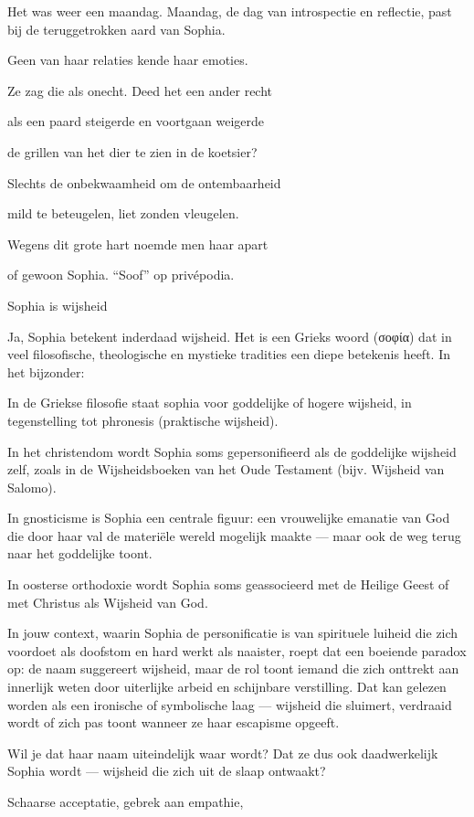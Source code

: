 Het was weer een maandag.
Maandag, de dag van introspectie en reflectie, past bij de teruggetrokken aard van Sophia.

Geen van haar relaties
kende haar emoties.

Ze zag die als onecht.
Deed het een ander recht

als een paard steigerde
en voortgaan weigerde

de grillen van het dier
te zien in de koetsier?

Slechts de onbekwaamheid
om de ontembaarheid

mild te beteugelen,
liet zonden vleugelen.

Wegens dit grote hart
noemde men haar apart

of gewoon Sophia.
“Soof” op privépodia.

Sophia is wijsheid

Ja, Sophia betekent inderdaad wijsheid. Het is een Grieks woord (σοφία) dat in veel filosofische, theologische en mystieke tradities een diepe betekenis heeft. In het bijzonder:

In de Griekse filosofie staat sophia voor goddelijke of hogere wijsheid, in tegenstelling tot phronesis (praktische wijsheid).

In het christendom wordt Sophia soms gepersonifieerd als de goddelijke wijsheid zelf, zoals in de Wijsheidsboeken van het Oude Testament (bijv. Wijsheid van Salomo).

In gnosticisme is Sophia een centrale figuur: een vrouwelijke emanatie van God die door haar val de materiële wereld mogelijk maakte — maar ook de weg terug naar het goddelijke toont.

In oosterse orthodoxie wordt Sophia soms geassocieerd met de Heilige Geest of met Christus als Wijsheid van God.

In jouw context, waarin Sophia de personificatie is van spirituele luiheid die zich voordoet als doofstom en hard werkt als naaister, roept dat een boeiende paradox op: de naam suggereert wijsheid, maar de rol toont iemand die zich onttrekt aan innerlijk weten door uiterlijke arbeid en schijnbare verstilling. Dat kan gelezen worden als een ironische of symbolische laag — wijsheid die sluimert, verdraaid wordt of zich pas toont wanneer ze haar escapisme opgeeft.

Wil je dat haar naam uiteindelijk waar wordt? Dat ze dus ook daadwerkelijk Sophia wordt — wijsheid die zich uit de slaap ontwaakt?

Schaarse acceptatie,
gebrek aan empathie,

